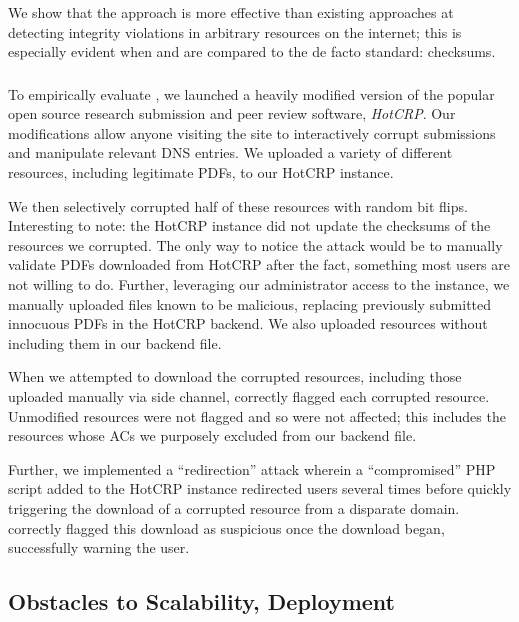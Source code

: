We show that the \SYSTEM{} approach is more effective than existing approaches
at detecting integrity violations in arbitrary resources on the internet; this
is especially evident when \DNSSYS{} and \DHTSYS{} are compared to the de facto
standard: checksums.

\subsubsection{\DNSSYS{}}

To empirically evaluate \DNSSYS{}, we launched a heavily modified version of the
popular open source research submission and peer review software, \emph{HotCRP}.
Our modifications allow anyone visiting the site to interactively corrupt
submissions and manipulate relevant DNS entries. We uploaded a variety of
different resources, including legitimate PDFs, to our HotCRP instance.

We then selectively corrupted half of these resources with random bit flips.
Interesting to note: the HotCRP instance did not update the checksums of the
resources we corrupted. The only way to notice the attack would be to manually
validate PDFs downloaded from HotCRP after the fact, something most users are
not willing to do. Further, leveraging our administrator access to the instance,
we manually uploaded files known to be malicious, replacing previously submitted
innocuous PDFs in the HotCRP backend. We also uploaded resources without
including them in our backend file.

When we attempted to download the corrupted resources, including those uploaded
manually via side channel, \SYSTEM{} correctly flagged each corrupted resource.
Unmodified resources were not flagged and so were not affected; this includes
the resources whose ACs we purposely excluded from our backend file.

Further, we implemented a ``redirection'' attack wherein a ``compromised'' PHP
script added to the HotCRP instance redirected users several times before
quickly triggering the download of a corrupted resource from a disparate domain.
\SYSTEM{} correctly flagged this download as suspicious once the download began,
successfully warning the user.

\subsubsection{\DHTSYS{}}



\subsection{Obstacles to Scalability, Deployment}

